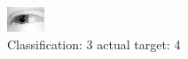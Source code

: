 \begin{figure}[h!]
\begin{center}
\includegraphics[width=0.60\columnwidth]{figures/ID2456_class_3_target_4.png}
\end{center}
\caption{ Classification: 3 actual target: 4}
\label{fig:ID2456_class_3_target_4}
\end{figure}
